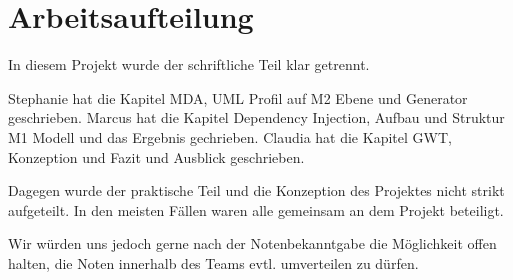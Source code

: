 \chapter{Arbeitsaufteilung}
\label{Arbeitsaufteilung}
In diesem Projekt wurde der schriftliche Teil klar getrennt.

Stephanie hat die Kapitel MDA, UML Profil auf M2 Ebene und Generator
geschrieben.
Marcus hat die Kapitel Dependency Injection, Aufbau und Struktur M1 Modell und
das Ergebnis gechrieben.
Claudia hat die Kapitel GWT, Konzeption und Fazit und Ausblick geschrieben.

Dagegen wurde der praktische Teil und die Konzeption des Projektes nicht
strikt aufgeteilt. In den meisten Fällen waren alle gemeinsam an dem Projekt
beteiligt.

Wir würden uns jedoch gerne nach der Notenbekanntgabe die Möglichkeit offen
halten, die Noten innerhalb des Teams evtl. umverteilen zu dürfen.

